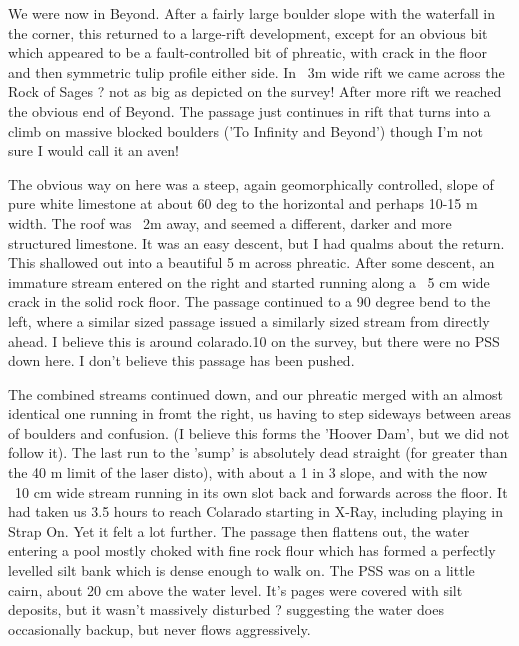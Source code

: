 We were now in Beyond. After a fairly large boulder slope with the waterfall in the corner, this returned to a large-rift development, except for an obvious bit which appeared to be a fault-controlled bit of phreatic, with crack in the floor and then symmetric tulip profile either side. In ~3m wide rift we came across the Rock of Sages ? not as big as depicted on the survey!
After more rift we reached the obvious end of Beyond. The passage just continues in rift that turns into a climb on massive blocked boulders ('To Infinity and Beyond') though I'm not sure I would call it an aven!

The obvious way on here was a steep, again geomorphically controlled, slope of pure white limestone at about 60 deg to the horizontal and perhaps 10-15 m width. The roof was ~2m away, and seemed a different, darker and more structured limestone. It was an easy descent, but I had qualms about the return.
This shallowed out into a beautiful 5 m across phreatic. After some descent, an immature stream entered on the right and started running along a ~5 cm wide crack in the solid rock floor. The passage continued to a 90 degree bend to the left, where a similar sized passage issued a similarly sized stream from directly ahead. I believe this is around colarado.10 on the survey, but there were no PSS down here. I don't believe this passage has been pushed.

The combined streams continued down, and our phreatic merged with an almost identical one running in fromt the right, us having to step sideways between areas of boulders and confusion. (I believe this forms the 'Hoover Dam', but we did not follow it).
The last run to the 'sump' is absolutely dead straight (for greater than the 40 m limit of the laser disto), with about a 1 in 3 slope, and with the now ~10 cm wide stream running in its own slot back and forwards across the floor. It had taken us 3.5 hours to reach Colarado starting in X-Ray, including playing in Strap On. Yet it felt a lot further.
The passage then flattens out, the water entering a pool mostly choked with fine rock flour which has formed a perfectly levelled silt bank which is dense enough to walk on. The PSS was on a little cairn, about 20 cm above the water level. It's pages were covered with silt deposits, but it wasn't massively disturbed ? suggesting the water does occasionally backup, but never flows aggressively.

